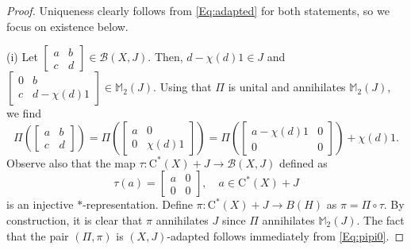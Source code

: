 \documentclass[10pt]{amsart}
\newcommand{\bM}{{\mathbb{M}}}
\newcommand{\B}{{\mathcal{B}}}
\newcommand{\rC}{\mathrm{C}}
\theoremstyle{definition}
\begin{document}
\begin{proof}
Uniqueness clearly follows from \eqref{Eq:adapted} for both statements, so we focus on existence below.

(i)  Let $\begin{bmatrix}
a& b \\ c & d
\end{bmatrix}\in \B(X,J)$. Then, $d-\chi(d)1 \in J$ and
$\begin{bmatrix}
0& b \\ c & d-\chi(d)1
\end{bmatrix}\in  \bM_2(J)$. 
Using that $\Pi$ is unital and annihilates $\bM_2(J)$, we find
\begin{equation}\label{Eq:pipi0}
\Pi\left(\begin{bmatrix}
a& b \\ c & d
\end{bmatrix}\right)
=\Pi\left(\begin{bmatrix}
a& 0 \\ 0 & \chi(d)1
\end{bmatrix}\right)=\Pi\left(\begin{bmatrix}
a-\chi(d)1& 0 \\ 0 & 0
\end{bmatrix}\right)+\chi(d)1.
\end{equation}
Observe also that the map $\tau:\rC^*(X)+J\to \B(X,J)$ defined as
\[
\tau(a)=\begin{bmatrix}
a& 0 \\ 0 & 0
\end{bmatrix}, \quad a\in \rC^*(X)+J
\]
is an injective $*$-representation.
Define $\pi:\rC^*(X)+J\to B(H)$ as $\pi=\Pi\circ \tau$.  By construction, it is clear that $\pi$ annihilates $J$ since $\Pi$ annihilates $\bM_2(J)$. The fact that the pair $(\Pi,\pi)$ is $(X,J)$-adapted follows immediately from \eqref{Eq:pipi0}.


\end{proof}
\end{document}
